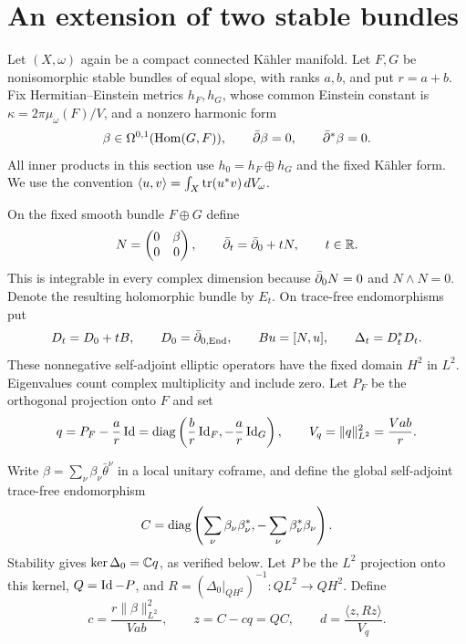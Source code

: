 \section{An extension of two stable bundles}\label{sec:two-factor}

Let $(X,\omega)$ again be a compact connected K\"ahler manifold. Let
$F,G$ be nonisomorphic stable bundles of equal slope, with ranks $a,b$,
and put $r=a+b$. Fix Hermitian--Einstein metrics $h_F,h_G$, whose common
Einstein constant is $\kappa=2\pi\mu_\omega(F)/V$, and a nonzero harmonic
form
\[
 \beta\in\Omega^{0,1}(\operatorname{Hom}(G,F)),\qquad
 \bar\partial\beta=0,\qquad \bar\partial^*\beta=0.
\]
All inner products in this section use $h_0=h_F\oplus h_G$ and the fixed
K\"ahler form. We use the convention
$\langle u,v\rangle=\int_X\operatorname{tr}(u^*v)\,dV_\omega$.

On the fixed smooth bundle $F\oplus G$ define
\begin{equation}\label{eq:two-family}
 N=\begin{pmatrix}0&\beta\\0&0\end{pmatrix},\qquad
 \bar\partial_t=\bar\partial_0+tN,\qquad t\in\mathbb R.
\end{equation}
This is integrable in every complex dimension because $\bar\partial_0N=0$ and
$N\wedge N=0$. Denote the resulting holomorphic bundle by $E_t$.
On trace-free endomorphisms put
\[
 D_t=D_0+tB,\qquad D_0=\bar\partial_{0,\operatorname{End}},\qquad
 Bu=[N,u],\qquad \Delta_t=D_t^*D_t.
\]
These nonnegative self-adjoint elliptic operators have the fixed domain
$H^2$ in $L^2$. Eigenvalues count complex multiplicity and include zero.
Let $P_F$ be the orthogonal projection onto $F$ and set
\begin{equation}\label{eq:two-q}
 q=P_F-\frac ar\operatorname{Id}
 =\operatorname{diag}\left(\frac br\operatorname{Id}_F,-\frac ar\operatorname{Id}_G\right),\qquad
 V_q=\lVert q\rVert_{L^2}^2=\frac{Vab}{r}.
\end{equation}

Write $\beta=\sum_\nu\beta_\nu\bar\theta^\nu$ in a local unitary
coframe, and define the global self-adjoint trace-free endomorphism
\begin{equation}\label{eq:two-C}
 C=\operatorname{diag}\left(\sum_\nu\beta_\nu\beta_\nu^*,
                  -\sum_\nu\beta_\nu^*\beta_\nu\right).
\end{equation}
Stability gives $\operatorname{ker}\Delta_0=\mathbb C q$, as verified below. Let $P$ be the
$L^2$ projection onto this kernel, $Q=\operatorname{Id}-P$, and
$R=(\Delta_0|_{QH^2})^{-1}:QL^2\to QH^2$. Define
\begin{equation}\label{eq:two-coefficients}
 c=\frac{r\lVert\beta\rVert_{L^2}^2}{Vab},\qquad
 z=C-cq=QC,\qquad d=\frac{\langle z,Rz\rangle}{V_q}.
\end{equation}

